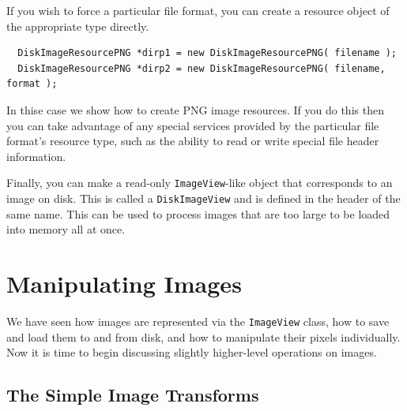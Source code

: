 If you wish to force a particular file format, you can create a resource 
object of the appropriate type directly.
\begin{verbatim}
  DiskImageResourcePNG *dirp1 = new DiskImageResourcePNG( filename );
  DiskImageResourcePNG *dirp2 = new DiskImageResourcePNG( filename, format );
\end{verbatim}
In thise case we show how to create PNG image resources.  If you do this 
then you can take advantage of any special services provided by the 
particular file format's resource type, such as the ability to read or 
write special file header information.

Finally, you can make a read-only \verb#ImageView#-like object that 
corresponds to an image on disk.  This is called a \verb#DiskImageView# 
and is defined in the header of the same name.  This can be used to 
process images that are too large to be loaded into memory all at once. 

\section{Manipulating Images}

We have seen how images are represented via the \verb#ImageView#
class, how to save and load them to and from disk, and how to
manipulate their pixels individually.  Now it is time to begin 
discussing slightly higher-level operations on images.

\subsection{The Simple Image Transforms}

